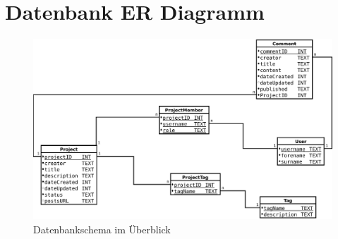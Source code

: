 \documentclass[12pt]{scrartcl}
\begin{document}
		\section{Datenbank ER Diagramm}	\label{sec:erdiagramm}
			\begin{landscape}
				\begin{figure}
	  				\centering
	  				\includegraphics[width=\linewidth,height=\textheight,keepaspectratio]{Bilder/db.pdf} 
	  				\caption{Datenbankschema im Überblick}
	  				\label{fig:db}
			 	\end{figure}
			\end{landscape}
		
\end{document}
